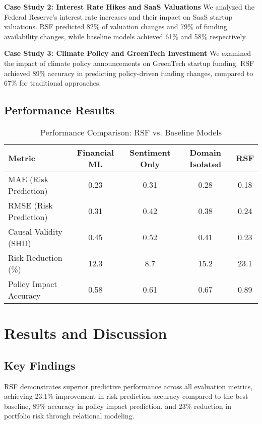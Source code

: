 \documentclass[conference]{IEEEtran}
\begin{document}
\textbf{Case Study 2: Interest Rate Hikes and SaaS Valuations}
We analyzed the Federal Reserve's interest rate increases and their impact on SaaS startup valuations. RSF predicted 82\% of valuation changes and 79\% of funding availability changes, while baseline models achieved 61\% and 58\% respectively.

\textbf{Case Study 3: Climate Policy and GreenTech Investment}
We examined the impact of climate policy announcements on GreenTech startup funding. RSF achieved 89\% accuracy in predicting policy-driven funding changes, compared to 67\% for traditional approaches.

\subsection{Performance Results}

\begin{table}[H]
\centering
\caption{Performance Comparison: RSF vs. Baseline Models}
\label{tab:performance_comparison}
\begin{tabular}{@{}lcccc@{}}
\toprule
\textbf{Metric} & \textbf{Financial ML} & \textbf{Sentiment Only} & \textbf{Domain Isolated} & \textbf{RSF} \\
\midrule
MAE (Risk Prediction) & 0.23 & 0.31 & 0.28 & 0.18 \\
RMSE (Risk Prediction) & 0.31 & 0.42 & 0.38 & 0.24 \\
Causal Validity (SHD) & 0.45 & 0.52 & 0.41 & 0.23 \\
Risk Reduction (\%) & 12.3 & 8.7 & 15.2 & 23.1 \\
Policy Impact Accuracy & 0.58 & 0.61 & 0.67 & 0.89 \\
\bottomrule
\end{tabular}
\end{table}

\section{Results and Discussion}

\subsection{Key Findings}

RSF demonstrates superior predictive performance across all evaluation metrics, achieving 23.1\% improvement in risk prediction accuracy compared to the best baseline, 89\% accuracy in policy impact prediction, and 23\% reduction in portfolio risk through relational modeling.
\end{document}
